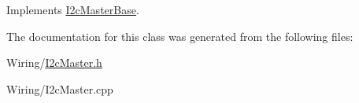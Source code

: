 Implements \hyperlink{class_i2c_master_base_aee4d48385a72b48a0a452ecfc2cd7fc0}{I2c\+Master\+Base}.



The documentation for this class was generated from the following files\+:\begin{DoxyCompactItemize}
\item 
Wiring/\hyperlink{_i2c_master_8h}{I2c\+Master.\+h}\item 
Wiring/I2c\+Master.\+cpp\end{DoxyCompactItemize}
